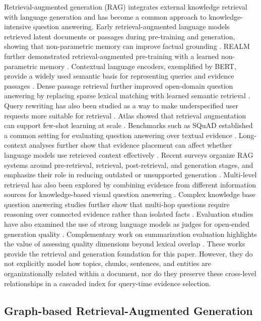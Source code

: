 \documentclass[a4paper,fleqn]{cas-dc}
\begin{document}
Retrieval-augmented generation (RAG) integrates external knowledge retrieval with language generation and has become a common approach to knowledge-intensive question answering. Early retrieval-augmented language models retrieved latent documents or passages during pre-training and generation, showing that non-parametric memory can improve factual grounding \citep{Lewis2020RAG}. REALM further demonstrated retrieval-augmented pre-training with a learned non-parametric memory \citep{Guu2020REALM}. Contextual language encoders, exemplified by BERT, provide a widely used semantic basis for representing queries and evidence passages \citep{Devlin2019BERT}. Dense passage retrieval further improved open-domain question answering by replacing sparse lexical matching with learned semantic retrieval \citep{Karpukhin2020DPR}. Query rewriting has also been studied as a way to make underspecified user requests more suitable for retrieval \citep{Ma2023QueryRewriting}. Atlas showed that retrieval augmentation can support few-shot learning at scale \citep{Izacard2023Atlas}. Benchmarks such as SQuAD established a common setting for evaluating question answering over textual evidence \citep{Rajpurkar2016SQuAD}. Long-context analyses further show that evidence placement can affect whether language models use retrieved context effectively \citep{Liu2024LostMiddle}. Recent surveys organize RAG systems around pre-retrieval, retrieval, post-retrieval, and generation stages, and emphasize their role in reducing outdated or unsupported generation \citep{Huang2026RAGSurvey}. Multi-level retrieval has also been explored by combining evidence from different information sources for knowledge-based visual question answering \citep{Adjali2024MultiLevelRAG}. Complex knowledge base question answering studies further show that multi-hop questions require reasoning over connected evidence rather than isolated facts \citep{Lan2023ComplexKBQA}. Evaluation studies have also examined the use of strong language models as judges for open-ended generation quality \citep{Zheng2023LLMJudge}. Complementary work on summarization evaluation highlights the value of assessing quality dimensions beyond lexical overlap \citep{Fabbri2021SummEval}. These works provide the retrieval and generation foundation for this paper. However, they do not explicitly model how topics, chunks, sentences, and entities are organizationally related within a document, nor do they preserve these cross-level relationships in a cascaded index for query-time evidence selection.

\subsection{Graph-based Retrieval-Augmented Generation}
\end{document}
